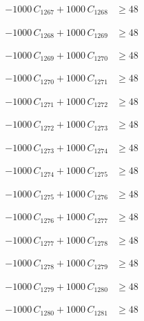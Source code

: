 \documentclass[a4paper,11pt]{article}
\begin{document}
\begin{align}
-1000\,C_{1267} + 1000\,C_{1268} &\geq 48 \nonumber
\end{align}

\begin{align}
-1000\,C_{1268} + 1000\,C_{1269} &\geq 48 \nonumber
\end{align}

\begin{align}
-1000\,C_{1269} + 1000\,C_{1270} &\geq 48 \nonumber
\end{align}

\begin{align}
-1000\,C_{1270} + 1000\,C_{1271} &\geq 48 \nonumber
\end{align}

\begin{align}
-1000\,C_{1271} + 1000\,C_{1272} &\geq 48 \nonumber
\end{align}

\begin{align}
-1000\,C_{1272} + 1000\,C_{1273} &\geq 48 \nonumber
\end{align}

\begin{align}
-1000\,C_{1273} + 1000\,C_{1274} &\geq 48 \nonumber
\end{align}

\begin{align}
-1000\,C_{1274} + 1000\,C_{1275} &\geq 48 \nonumber
\end{align}

\begin{align}
-1000\,C_{1275} + 1000\,C_{1276} &\geq 48 \nonumber
\end{align}

\begin{align}
-1000\,C_{1276} + 1000\,C_{1277} &\geq 48 \nonumber
\end{align}

\begin{align}
-1000\,C_{1277} + 1000\,C_{1278} &\geq 48 \nonumber
\end{align}

\begin{align}
-1000\,C_{1278} + 1000\,C_{1279} &\geq 48 \nonumber
\end{align}

\begin{align}
-1000\,C_{1279} + 1000\,C_{1280} &\geq 48 \nonumber
\end{align}

\begin{align}
-1000\,C_{1280} + 1000\,C_{1281} &\geq 48 \nonumber
\end{align}
\end{document}
